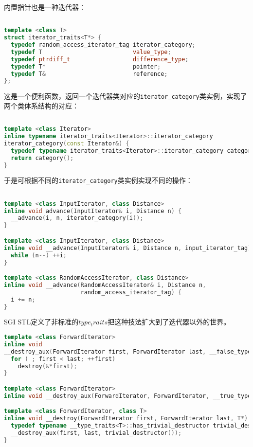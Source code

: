 内置指针也是一种迭代器：
\begin{lstlisting}[language=C++]

template <class T>
struct iterator_traits<T*> {
  typedef random_access_iterator_tag iterator_category;
  typedef T                          value_type;
  typedef ptrdiff_t                  difference_type;
  typedef T*                         pointer;
  typedef T&                         reference;
};

\end{lstlisting}

这是一个便利函数，返回一个迭代器类对应的\verb$iterator_category$类实例，实现了两个类体系结构的对应：
\begin{lstlisting}[language=C++]

template <class Iterator>
inline typename iterator_traits<Iterator>::iterator_category
iterator_category(const Iterator&) {
  typedef typename iterator_traits<Iterator>::iterator_category category;
  return category();
}

\end{lstlisting}

于是可根据不同的\verb$iterator_category$类实例实现不同的操作：
\begin{lstlisting}[language=C++]

template <class InputIterator, class Distance>
inline void advance(InputIterator& i, Distance n) {
  __advance(i, n, iterator_category(i));
}

template <class InputIterator, class Distance>
inline void __advance(InputIterator& i, Distance n, input_iterator_tag) {
  while (n--) ++i;
}

template <class RandomAccessIterator, class Distance>
inline void __advance(RandomAccessIterator& i, Distance n, 
                      random_access_iterator_tag) {
  i += n;
}


\end{lstlisting}

SGI STL定义了非标准的$type_traits$把这种技法扩大到了迭代器以外的世界。

\begin{lstlisting}[language=C++]
template <class ForwardIterator>
inline void
__destroy_aux(ForwardIterator first, ForwardIterator last, __false_type) {
  for ( ; first < last; ++first)
    destroy(&*first);
}

template <class ForwardIterator> 
inline void __destroy_aux(ForwardIterator, ForwardIterator, __true_type) {}

template <class ForwardIterator, class T>
inline void __destroy(ForwardIterator first, ForwardIterator last, T*) {
  typedef typename __type_traits<T>::has_trivial_destructor trivial_destructor;
  __destroy_aux(first, last, trivial_destructor());
}

\end{lstlisting}








